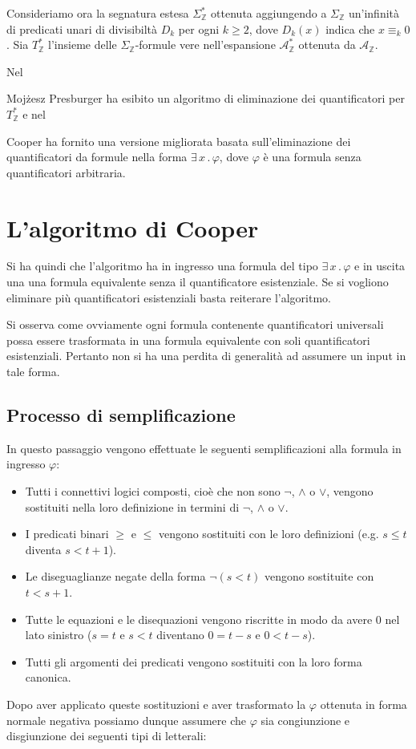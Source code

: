 \documentclass[11pt,letterpaper,twoside]{article}
\begin{document}
Consideriamo ora la segnatura estesa $\Sigma_{\mathbb{Z}}^*$ ottenuta aggiungendo
a $\Sigma_{\mathbb{Z}}$ un'infinità di predicati unari di divisibiltà $D_k$
per ogni $k \ge 2$, dove $D_k(x)$ indica che $x \equiv_k 0$.
Sia $T_{\mathbb{Z}}^*$ l'insieme delle $\Sigma_{\mathbb{Z}}$-formule vere
nell'espansione $\mathcal{A}_{\mathbb{Z}}^*$ ottenuta da
$\mathcal{A}_{\mathbb{Z}}$.

Nel \date{1930} Moj\.zesz Presburger ha esibito un algoritmo di eliminazione dei
quantificatori\autocite{presburger} per $T_{\mathbb{Z}}^*$ e nel \date{1972} Cooper ha fornito una
versione migliorata basata sull'eliminazione dei quantificatori da formule nella
forma $\exists \,x \,.\, \varphi$, dove $\varphi$ è una formula senza
quantificatori arbitraria.

\section{L'algoritmo di Cooper}
Si ha quindi che l'algoritmo ha in ingresso una formula del tipo $\exists
\,x \,.\, \varphi$ e in uscita una una formula equivalente senza il
quantificatore esistenziale. Se si vogliono eliminare pi\`u quantificatori
esistenziali basta reiterare l'algoritmo.

Si osserva come ovviamente ogni formula contenente quantificatori universali
possa essere trasformata in una formula equivalente con soli quantificatori
esistenziali.
Pertanto non si ha una perdita di generalità ad assumere un input in tale
forma.

\subsection{Processo di semplificazione}
In questo passaggio vengono effettuate le seguenti semplificazioni alla formula
in ingresso $\varphi$:
\begin{itemize}
\item Tutti i connettivi logici composti, cioè che non sono $\lnot$, $\land$ o
  $\lor$, vengono sostituiti nella loro definizione in termini di $\lnot$,
  $\land$ o $\lor$.
\item I predicati binari $\ge$ e $\le$ vengono sostituiti con le loro
  definizioni (e.g. $s \le t$ diventa $s < t + 1$). 
\item Le diseguaglianze negate della forma $\lnot (s < t)$ vengono sostituite
  con $t < s + 1$.
\item Tutte le equazioni e le disequazioni vengono riscritte in modo da avere
  $0$ nel lato sinistro ($s=t$ e $s<t$ diventano $0=t-s$ e $0<t-s$).
\item Tutti gli argomenti dei predicati vengono sostituiti con la loro forma
  canonica.
\end{itemize}
Dopo aver applicato queste sostituzioni e aver trasformato la $\varphi$ ottenuta
in forma normale negativa possiamo dunque assumere che $\varphi$ sia
congiunzione e disgiunzione dei seguenti tipi di letterali:
\end{document}
